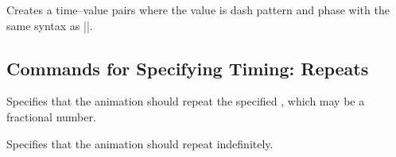 \begin{command}{\pgfsysanimvaldash{}}
\end{command}
\begin{command}{\pgfsys@animation@val@dash{}}
    Creates a time--value pairs where the value is dash pattern and phase with
    the same syntax as |\pgfsys@setdash|.
\end{command}


\subsection{Commands for Specifying Timing: Repeats}

\begin{command}{}
\end{command}
\begin{command}{\pgfsys@animation@repeat{}}
    Specifies that the animation should repeat the specified , which may be a fractional number.
\begin{codeexample}[
    width=6cm,
    preamble={\usetikzlibrary{animations}},
    animation list={1,2,3,4,5,6,7,8},
]
\end{codeexample}
\end{command}

\begin{command}{\pgfsysanimkeyrepeatindefinite}
\end{command}
\begin{command}{\pgfsys@animation@repeat@indefinite}
    Specifies that the animation should repeat indefinitely.
\begin{codeexample}[
    width=6cm,
    preamble={\usetikzlibrary{animations}},
    animation list={1,2,3,4,5,6,7,8},
]
\end{codeexample}
\end{command}

